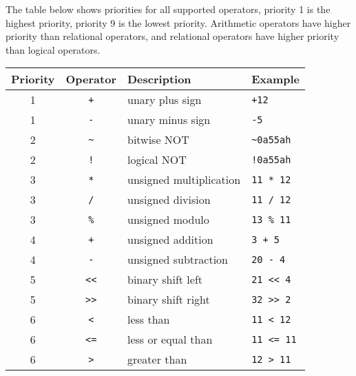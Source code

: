         The table below shows priorities for all supported operators, priority 1 is the highest priority, priority 9 is the lowest priority. Arithmetic operators have higher priority than relational operators, and relational operators have higher priority than logical operators.

        \begin{table}[h!]
            \centering
            \begin{tabular}{|c|c|l|l|}
                \hline
                \textbf{Priority} & \textbf{Operator} & \textbf{Description} & \textbf{Example} \\\hline
                1        & \texttt{+}    & unary plus sign         & \texttt{+12}               \\\hline
                1        & \texttt{-}    & unary minus sign        & \texttt{-5}                \\\hline
                2        & \texttt{\~{}} & bitwise NOT             & \texttt{\~{}0a55ah}        \\\hline
                2        & \texttt{!}    & logical NOT             & \texttt{!0a55ah}           \\\hline
                3        & \texttt{*}    & unsigned multiplication & \texttt{11 * 12}           \\\hline
                3        & \texttt{/}    & unsigned division       & \texttt{11 / 12}           \\\hline
                3        & \texttt{\%}   & unsigned modulo         & \texttt{13 \% 11}          \\\hline
                4        & \texttt{+}    & unsigned addition       & \texttt{3 + 5}             \\\hline
                4        & \texttt{-}    & unsigned subtraction    & \texttt{20 - 4}            \\\hline
                5        & \texttt{<{}<} & binary shift left       & \texttt{21 <{}< 4}         \\\hline
                5        & \texttt{>{}>} & binary shift right      & \texttt{32 >{}> 2}         \\\hline
                6        & \texttt{<}    & less than               & \texttt{11 < 12}           \\\hline
                6        & \texttt{<=}   & less or equal than      & \texttt{11 <= 11}          \\\hline
                6        & \texttt{>}    & greater than            & \texttt{12 > 11}           \\\hline

\end{tabular}
\end{table}
